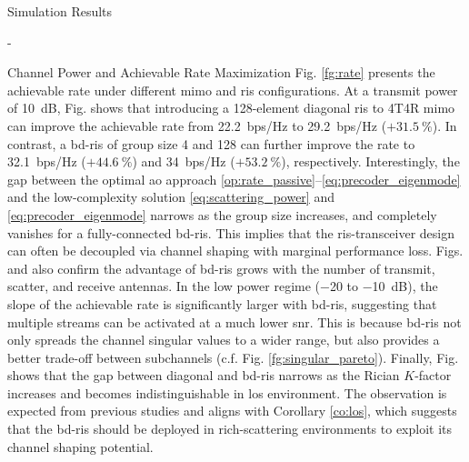 \begin{section}{Simulation Results}
\begin{subsection}{-}
\begin{subsubsection}{Channel Power and Achievable Rate Maximization}
			Fig. \ref{fg:rate} presents the achievable rate under different \gls{mimo} and \gls{ris} configurations.
			At a transmit power of \qty{10}{dB}, Fig.  shows that introducing a 128-element diagonal \gls{ris} to 4T4R \gls{mimo} can improve the achievable rate from \qty{22.2}{bps/Hz} to \qty{29.2}{bps/Hz} ($+\qty{31.5}{\percent}$).
			In contrast, a \gls{bd}-\gls{ris} of group size 4 and 128 can further improve the rate to \qty{32.1}{bps/Hz} ($+\qty{44.6}{\percent}$) and \qty{34}{bps/Hz}  ($+\qty{53.2}{\percent}$), respectively.
			Interestingly, the gap between the optimal \gls{ao} approach \eqref{op:rate_passive}--\eqref{eq:precoder_eigenmode} and the low-complexity solution \eqref{eq:scattering_power} and \eqref{eq:precoder_eigenmode} narrows as the group size increases, and completely vanishes for a fully-connected \gls{bd}-\gls{ris}.
			This implies that the \gls{ris}-transceiver design can often be decoupled via channel shaping with marginal performance loss.
			Figs.  and  also confirm the advantage of \gls{bd}-\gls{ris} grows with the number of transmit, scatter, and receive antennas.
			In the low power regime (\num{-20} to \qty{-10}{dB}), the slope of the achievable rate is significantly larger with \gls{bd}-\gls{ris}, suggesting that multiple streams can be activated at a much lower \gls{snr}.
			This is because \gls{bd}-\gls{ris} not only spreads the channel singular values to a wider range, but also provides a better trade-off between subchannels (c.f. Fig. \ref{fg:singular_pareto}).
			Finally, Fig.  shows that the gap between diagonal and \gls{bd}-\gls{ris} narrows as the Rician $K$-factor increases and becomes indistinguishable in \gls{los} environment.
			The observation is expected from previous studies \cite{Shen2020a,Li2023b,Nerini2023} and aligns with Corollary \ref{co:los}, which suggests that the \gls{bd}-\gls{ris} should be deployed in rich-scattering environments to exploit its channel shaping potential.
		\end{subsubsection}
	\end{subsection}


\end{section}
